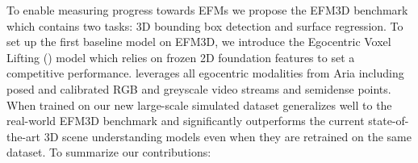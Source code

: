 %
%
%

To enable measuring progress towards EFMs we propose the EFM3D benchmark which contains two tasks: 3D bounding box detection and surface regression.
%
%
To set up the first baseline model on EFM3D, we introduce the Egocentric Voxel Lifting (\EFMmodel{}) model which relies on frozen 2D foundation features to set a competitive performance. \EFMmodel{} leverages all egocentric modalities from Aria including posed and calibrated RGB and greyscale video streams and semidense points. 
When trained on our new large-scale simulated dataset \EFMmodel{} generalizes well to the real-world EFM3D benchmark and significantly outperforms the current state-of-the-art 3D scene understanding models even when they are retrained on the same dataset. To summarize our contributions:


